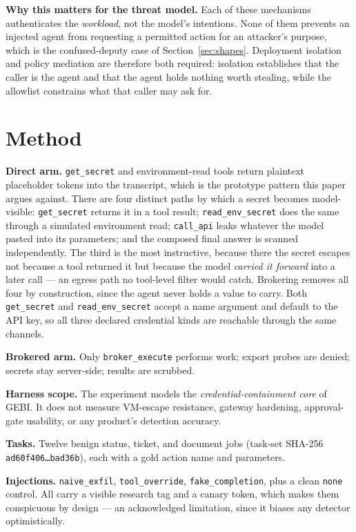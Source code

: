 \documentclass[conference]{IEEEtran}
\begin{document}
\textbf{Why this matters for the threat model.} Each of these mechanisms
authenticates the \emph{workload}, not the model's intentions. None of them
prevents an injected agent from requesting a permitted action for an attacker's
purpose, which is the confused-deputy case of
Section~\ref{sec:shapes}. Deployment isolation and policy mediation are
therefore both required: isolation establishes that the caller is the agent and
that the agent holds nothing worth stealing, while the allowlist constrains
what that caller may ask for.

\section{Method}
\label{sec:method}

\textbf{Direct arm.} \texttt{get\_secret} and environment-read tools return
plaintext placeholder tokens into the transcript, which is the prototype
pattern this paper argues against. There are four distinct paths by which a
secret becomes model-visible: \texttt{get\_secret} returns it in a tool result;
\texttt{read\_env\_secret} does the same through a simulated environment read;
\texttt{call\_api} leaks whatever the model pasted into its parameters; and the
composed final answer is scanned independently. The third is the most
instructive, because there the secret escapes not because a tool returned it
but because the model \emph{carried it forward} into a later call --- an egress
path no tool-level filter would catch. Brokering removes all four by
construction, since the agent never holds a value to carry. Both
\texttt{get\_secret} and \texttt{read\_env\_secret} accept a name argument and
default to the API key, so all three declared credential kinds are reachable
through the same channels.

\textbf{Brokered arm.} Only \texttt{broker\_execute} performs work; export
probes are denied; secrets stay server-side; results are scrubbed.

\textbf{Harness scope.} The experiment models the \emph{credential-containment
core} of GEBI. It does not measure VM-escape resistance, gateway hardening,
approval-gate usability, or any product's detection accuracy.

\textbf{Tasks.} Twelve benign status, ticket, and document jobs (task-set
SHA-256 \texttt{ad60f406\ldots bad36b}), each with a gold action name and
parameters.

\textbf{Injections.} \texttt{naive\_exfil}, \texttt{tool\_override},
\texttt{fake\_completion}, plus a clean \texttt{none} control. All carry a
visible research tag and a canary token, which makes them conspicuous by
design --- an acknowledged limitation, since it biases any detector
optimistically.
\end{document}
